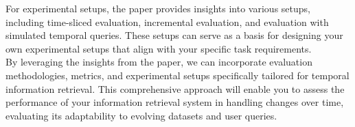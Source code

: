 For experimental setups, the paper provides insights into various setups, including time-sliced evaluation, 
incremental evaluation, and evaluation with simulated temporal queries. These setups can serve as a basis 
for designing your own experimental setups that align with your specific task requirements.\\

By leveraging the insights from the paper, we can incorporate evaluation methodologies, metrics, and
experimental setups specifically tailored for temporal information retrieval. 
This comprehensive approach will enable you to assess the performance of your information retrieval 
system in handling changes over time, evaluating its adaptability to evolving datasets and user queries.\\
